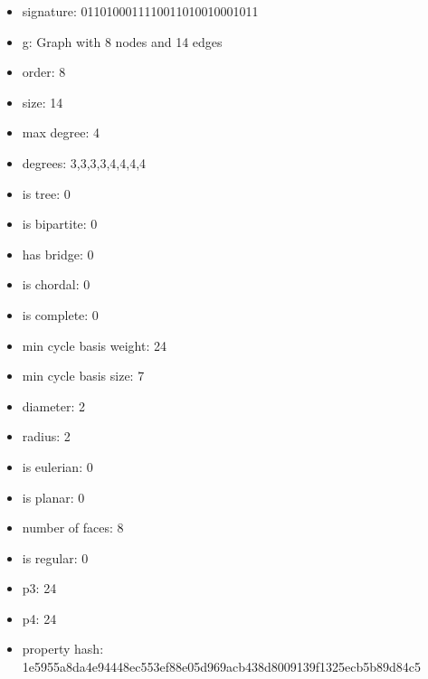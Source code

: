 \begin{itemize}
\item signature: 0110100011110011010010001011
\item g: Graph with 8 nodes and 14 edges
\item order: 8
\item size: 14
\item max degree: 4
\item degrees: 3,3,3,3,4,4,4,4
\item is tree: 0
\item is bipartite: 0
\item has bridge: 0
\item is chordal: 0
\item is complete: 0
\item min cycle basis weight: 24
\item min cycle basis size: 7
\item diameter: 2
\item radius: 2
\item is eulerian: 0
\item is planar: 0
\item number of faces: 8
\item is regular: 0
\item p3: 24
\item p4: 24
\item property hash: 1e5955a8da4e94448ec553ef88e05d969acb438d8009139f1325ecb5b89d84c5
\end{itemize}
\newpage
\begin{figure}
\end{figure}
